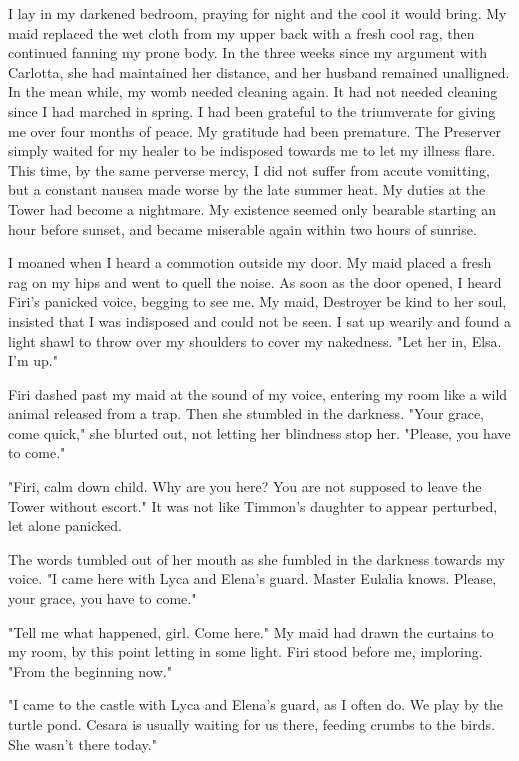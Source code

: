 \documentclass{article}
\begin{document}
\vspace{.5cm}


I lay in my darkened bedroom, praying for night and the cool it would bring. My maid replaced the wet cloth from my upper back with a fresh cool rag, then continued fanning my prone body. In the three weeks since my argument with Carlotta, she had maintained her distance, and her husband remained unalligned. In the mean while, my womb needed cleaning again. It had not needed cleaning since I had marched in spring. I had been grateful to the triumverate for giving me over four months of peace. My gratitude had been premature. The Preserver simply waited for my healer to be indisposed towards me to let my illness flare. This time, by the same perverse mercy, I did not suffer from accute vomitting, but a constant nausea made worse by the late summer heat. My duties at the Tower had become a nightmare. My existence seemed only bearable starting an hour before sunset, and became miserable again within two hours of sunrise.

I moaned when I heard a commotion outside my door. My maid placed a fresh rag on my hips and went to quell the noise. As soon as the door opened, I heard Firi's panicked voice, begging to see me. My maid, Destroyer be kind to her soul, insisted that I was indisposed and could not be seen. I sat up wearily and found a light shawl to throw over my shoulders to cover my nakedness. "Let her in, Elsa. I'm up."

Firi dashed past my maid at the sound of my voice, entering my room like a wild animal released from a trap. Then she stumbled in the darkness. "Your grace, come quick," she blurted out, not letting her blindness stop her. "Please, you have to come."

"Firi, calm down child. Why are you here? You are not supposed to leave the Tower without escort." It was not like Timmon's daughter to appear perturbed, let alone panicked.

The words tumbled out of her mouth as she fumbled in the darkness towards my voice. "I came here with Lyca and Elena's guard. Master Eulalia knows. Please, your grace, you have to come."

"Tell me what happened, girl. Come here." My maid had drawn the curtains to my room, by this point letting in some light. Firi stood before me, imploring. "From the beginning now."

"I came to the castle with Lyca and Elena's guard, as I often do. We play by the turtle pond. Cesara is usually waiting for us there, feeding crumbs to the birds. She wasn't there today."
\end{document}
